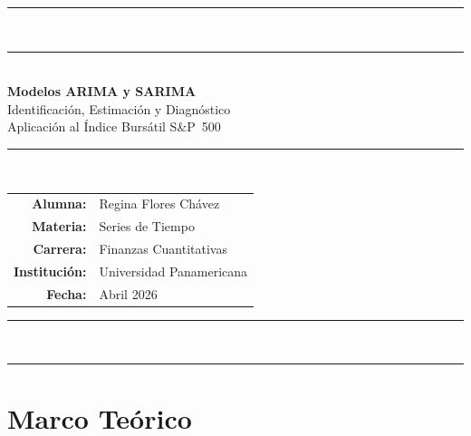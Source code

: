 \documentclass[12pt,a4paper]{article}
\begin{document}
\begin{titlepage}
  \centering
  \vspace*{1cm}
  {\color{upnavy}\rule{\linewidth}{2.5pt}}\\[0.3cm]
  {\color{upgold}\rule{\linewidth}{1pt}}\\[2cm]

  {\fontsize{22}{28}\selectfont\bfseries\color{upnavy}
    Modelos ARIMA y SARIMA}\\[0.5cm]
  {\Large\color{accentblue}
    Identificaci\'{o}n, Estimaci\'{o}n y Diagn\'{o}stico}\\[0.3cm]
  {\large\color{gray}
    Aplicaci\'{o}n al \'{I}ndice Burs\'{a}til S\&P~500}

  \vspace{1.8cm}
  {\color{upgold}\rule{0.65\linewidth}{0.8pt}}\\[1.8cm]

  \begin{tabular}{@{}rl@{}}
    \textbf{\color{upnavy}Alumna:}      & Regina Flores Ch\'{a}vez \\[0.5em]
    \textbf{\color{upnavy}Materia:}     & Series de Tiempo \\[0.5em]
    \textbf{\color{upnavy}Carrera:}     & Finanzas Cuantitativas \\[0.5em]
    \textbf{\color{upnavy}Instituci\'{o}n:} & Universidad Panamericana \\[0.5em]
    \textbf{\color{upnavy}Fecha:}       & Abril 2026 \\
  \end{tabular}

  \vfill
  {\color{upgold}\rule{0.65\linewidth}{0.8pt}}\\[1cm]
  {\color{upnavy}\rule{\linewidth}{2.5pt}}
\end{titlepage}

\setcounter{tocdepth}{2}
\tableofcontents
\newpage

\section{Marco Te\'{o}rico}
\end{document}
